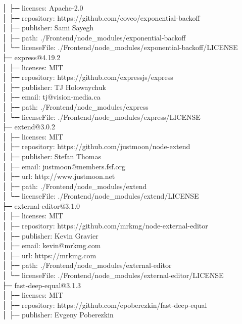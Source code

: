 │  ├─ licenses: Apache-2.0\\
│  ├─ repository: https://github.com/coveo/exponential-backoff\\
│  ├─ publisher: Sami Sayegh\\
│  ├─ path: ./Frontend/node\_modules/exponential-backoff\\
│  └─ licenseFile: ./Frontend/node\_modules/exponential-backoff/LICENSE\\
├─ express@4.19.2\\
│  ├─ licenses: MIT\\
│  ├─ repository: https://github.com/expressjs/express\\
│  ├─ publisher: TJ Holowaychuk\\
│  ├─ email: tj@vision-media.ca\\
│  ├─ path: ./Frontend/node\_modules/express\\
│  └─ licenseFile: ./Frontend/node\_modules/express/LICENSE\\
├─ extend@3.0.2\\
│  ├─ licenses: MIT\\
│  ├─ repository: https://github.com/justmoon/node-extend\\
│  ├─ publisher: Stefan Thomas\\
│  ├─ email: justmoon@members.fsf.org\\
│  ├─ url: http://www.justmoon.net\\
│  ├─ path: ./Frontend/node\_modules/extend\\
│  └─ licenseFile: ./Frontend/node\_modules/extend/LICENSE\\
├─ external-editor@3.1.0\\
│  ├─ licenses: MIT\\
│  ├─ repository: https://github.com/mrkmg/node-external-editor\\
│  ├─ publisher: Kevin Gravier\\
│  ├─ email: kevin@mrkmg.com\\
│  ├─ url: https://mrkmg.com\\
│  ├─ path: ./Frontend/node\_modules/external-editor\\
│  └─ licenseFile: ./Frontend/node\_modules/external-editor/LICENSE\\
├─ fast-deep-equal@3.1.3\\
│  ├─ licenses: MIT\\
│  ├─ repository: https://github.com/epoberezkin/fast-deep-equal\\
│  ├─ publisher: Evgeny Poberezkin\\
